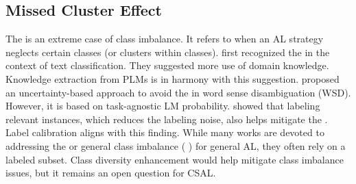 \subsection{Missed Cluster Effect}
The \mse{} \citep{10.1145/1183614.1183709,tomanek-etal-2009-proper} is an extreme case of class imbalance.
It refers to when an AL strategy neglects certain classes (or clusters within classes).
\citet{10.1145/1183614.1183709} first recognized the \mse{} in the context of text classification.
They suggested more use of domain knowledge. %
Knowledge extraction from PLMs is in harmony with this suggestion.
\citet{dligach-palmer-2011-good} proposed an uncertainty-based approach to avoid the \mse{} in word sense disambiguation (WSD). %
However, it is based on task-agnostic LM probability.
\citet{marcheggiani-artieres-2014-experimental} showed that labeling relevant instances, which reduces the labeling noise, also helps mitigate the \mse{}.
Label calibration aligns with this finding.
While many works are devoted to addressing the \mse{} or general class imbalance (\eg{} \citealp{9093475,fairstein-etal-2024-class}) for general AL, they often rely on a labeled subset. %
Class diversity enhancement would help mitigate class imbalance issues, but it remains an open question for CSAL.